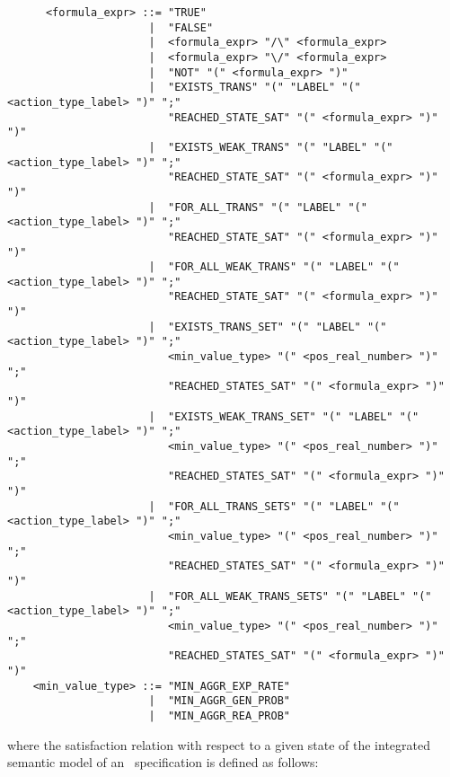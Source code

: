 	\begin{verbatim}
      <formula_expr> ::= "TRUE"
                      |  "FALSE"
                      |  <formula_expr> "/\" <formula_expr>
                      |  <formula_expr> "\/" <formula_expr>
                      |  "NOT" "(" <formula_expr> ")"
                      |  "EXISTS_TRANS" "(" "LABEL" "(" <action_type_label> ")" ";"
                         "REACHED_STATE_SAT" "(" <formula_expr> ")" ")"
                      |  "EXISTS_WEAK_TRANS" "(" "LABEL" "(" <action_type_label> ")" ";"
                         "REACHED_STATE_SAT" "(" <formula_expr> ")" ")"
                      |  "FOR_ALL_TRANS" "(" "LABEL" "(" <action_type_label> ")" ";"
                         "REACHED_STATE_SAT" "(" <formula_expr> ")" ")"
                      |  "FOR_ALL_WEAK_TRANS" "(" "LABEL" "(" <action_type_label> ")" ";"
                         "REACHED_STATE_SAT" "(" <formula_expr> ")" ")"
                      |  "EXISTS_TRANS_SET" "(" "LABEL" "(" <action_type_label> ")" ";"
                         <min_value_type> "(" <pos_real_number> ")" ";"
                         "REACHED_STATES_SAT" "(" <formula_expr> ")" ")"
                      |  "EXISTS_WEAK_TRANS_SET" "(" "LABEL" "(" <action_type_label> ")" ";"
                         <min_value_type> "(" <pos_real_number> ")" ";"
                         "REACHED_STATES_SAT" "(" <formula_expr> ")" ")"
                      |  "FOR_ALL_TRANS_SETS" "(" "LABEL" "(" <action_type_label> ")" ";"
                         <min_value_type> "(" <pos_real_number> ")" ";"
                         "REACHED_STATES_SAT" "(" <formula_expr> ")" ")"
                      |  "FOR_ALL_WEAK_TRANS_SETS" "(" "LABEL" "(" <action_type_label> ")" ";"
                         <min_value_type> "(" <pos_real_number> ")" ";"
                         "REACHED_STATES_SAT" "(" <formula_expr> ")" ")"
    <min_value_type> ::= "MIN_AGGR_EXP_RATE"
                      |  "MIN_AGGR_GEN_PROB"
                      |  "MIN_AGGR_REA_PROB"
        \end{verbatim}

\noindent where the satisfaction relation with respect to a given state of the integrated semantic model of
an \aemilia\ specification is defined as follows:

